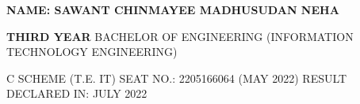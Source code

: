 \documentclass{article} %
\begin{document}
\textbf{\underbar{}}

\noindent \textbf{\underbar{}}

\noindent \textbf{\underbar{}}

\noindent \textbf{\underbar{}}

\noindent \textbf{\underbar{}}

\noindent \textbf{\underbar{}}

\noindent \textbf{\underbar{}}

\noindent \textbf{\underbar{}}

\noindent \textbf{\underbar{}}

\noindent \textbf{\underbar{}}

\noindent \textbf{\underbar{}}

\noindent \textbf{\underbar{}}

\noindent \textbf{\underbar{}}

\noindent \textbf{\underbar{}}

\textbf{}

\noindent 

\noindent \textbf{NAME: SAWANT CHINMAYEE MADHUSUDAN NEHA}

\noindent \textbf{}

\noindent \textbf{THIRD YEAR} BACHELOR OF ENGINEERING (INFORMATION TECHNOLOGY ENGINEERING)\textbf{\underbar{}}

\noindent \textbf{\underbar{}}

\noindent \textbf{    } C SCHEME (T.E. IT)         SEAT NO.: 2205166064 (MAY 2022)        RESULT DECLARED IN: JULY 2022

\noindent 

\noindent \textbf{\underbar{}}
\end{document}

